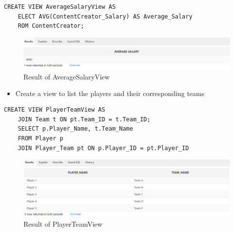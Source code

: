\begin{lstlisting}[caption={ AvgSalaryView },label={lst:V-2}]
    CREATE VIEW AverageSalaryView AS
    ELECT AVG(ContentCreator_Salary) AS Average_Salary
    ROM ContentCreator;
\end{lstlisting}
\begin{figure}[H]
    \centering
    \includegraphics[width=1\textwidth]{images/dml/views/v2.png}
    \caption{Result of AverageSalaryView}
\end{figure}
\begin{itemize}
    \item Create a view to list the players and their corresponding teams
\end{itemize}
\begin{lstlisting}[caption={ PlayerTeamView },label={lst:V-3}]
    CREATE VIEW PlayerTeamView AS
    JOIN Team t ON pt.Team_ID = t.Team_ID;
    SELECT p.Player_Name, t.Team_Name
    FROM Player p
    JOIN Player_Team pt ON p.Player_ID = pt.Player_ID
\end{lstlisting}
\begin{figure}[H]
    \centering
    \includegraphics[width=1\textwidth]{images/dml/views/v3.png}
    \caption{Result of PlayerTeamView}
\end{figure}
